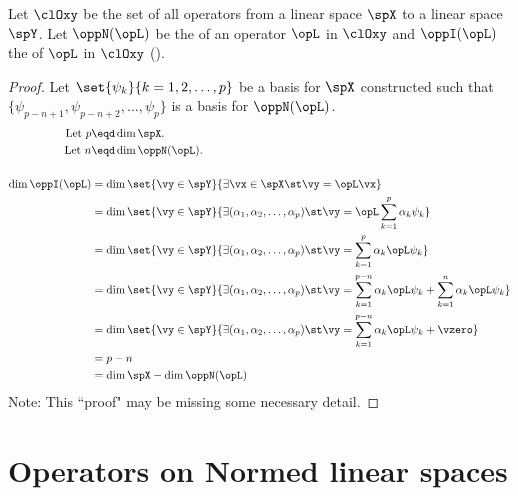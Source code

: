 \begin{theorem}
Let $\clOxy$ be the set of all operators from a linear space $\spX$ to a linear space $\spY$.
Let $\oppN(\opL)$ be the  of an operator $\opL$ in $\clOxy$
and $\oppI(\opL)$ the  of $\opL$ in $\clOxy$
().
\thmbox{
  \dim \oppI(\opL) + \dim\oppN(\opL) = \dim \spX
  \qquad\scriptstyle
  \forall \opL\in\clOxy
  }
\end{theorem}
\begin{proof}
Let $\set{\psi_k}{k=1,2,\ldots,p}$ be a basis for $\spX$
constructed such that $\{\psi_{p-n+1},\psi_{p-n+2},\ldots,\psi_p\}$
is a basis for $\oppN(\opL)$.
\begin{align*}
  \text{Let } p &\eqd \dim\spX.         \\
  \text{Let } n &\eqd \dim\oppN(\opL).  \\
  \\
  \dim\oppI(\opL)
    &= \dim \set{\vy\in\spY}{\exists\vx\in\spX \st \vy=\opL\vx}
  \\&= \dim \set{\vy\in\spY}{\exists(\alpha_1,\alpha_2,\ldots,\alpha_p) \st \vy=\opL\sum_{k=1}^p\alpha_k\psi_k}
  \\&= \dim \set{\vy\in\spY}{\exists(\alpha_1,\alpha_2,\ldots,\alpha_p) \st
            \vy=\sum_{k=1}^p\alpha_k\opL\psi_k}
  \\&= \dim \set{\vy\in\spY}{\exists(\alpha_1,\alpha_2,\ldots,\alpha_p) \st
            \vy=\sum_{k=1}^{p-n}\alpha_k\opL\psi_k+\sum_{k=1}^n\alpha_k\opL\psi_k}
  \\&= \dim \set{\vy\in\spY}{\exists(\alpha_1,\alpha_2,\ldots,\alpha_p) \st
            \vy=\sum_{k=1}^{p-n}\alpha_k\opL\psi_k+\vzero}
  \\&= p-n
  \\&= \dim\spX - \dim\oppN(\opL)
\end{align*}
Note: This ``proof" may be missing some necessary detail. \problem
\end{proof}

\section{Operators on Normed linear spaces}

